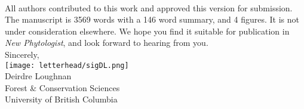 \documentclass[11pt,a4paper]{article}
\begin{document}
\vspace{1.5ex}\\
\noindent All authors contributed to this work and approved this version for submission. The manuscript is 3569 words with a 146 word summary, and 4 figures. It is not under consideration elsewhere. We hope you find it suitable for publication in \emph{New Phytologist}, and look forward to hearing from you. 
\vspace{1.5ex}\\
\noindent Sincerely, \\
\texttt{[image: letterhead/sigDL.png]} \\
\noindent Deirdre Loughnan\\
\noindent Forest \& Conservation Sciences\\
\noindent University of British Columbia

\newpage
\end{document}
